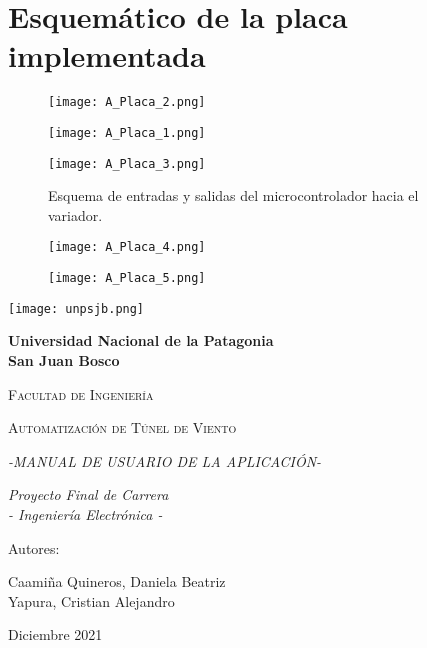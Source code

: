 \section{Esquemático de la placa implementada}
\begin{figure}[H]
	\centering
	\texttt{[image: A\_Placa\_2.png]}
\end{figure}
\begin{figure}[H]
	\centering	\texttt{[image: A\_Placa\_1.png]}
\end{figure}
\begin{figure}[H]
	\centering
	\texttt{[image: A\_Placa\_3.png]}
	
	\caption{Esquema de entradas y salidas del microcontrolador hacia el variador.} 
\end{figure}
\begin{figure}[H]
	\centering	\texttt{[image: A\_Placa\_4.png]}
\end{figure}	
\begin{figure}[H]
	\centering	\texttt{[image: A\_Placa\_5.png]}
\end{figure}


\newpage




\begin{center}
		{\texttt{[image: unpsjb.png]}\par}
	\vspace{1cm}
	{\bfseries\LARGE Universidad Nacional de la Patagonia\\ San Juan Bosco \par}
	\vspace{1cm}
	{\scshape\Large Facultad de Ingenier\'ia \par}
	\vspace{3cm}
	{\scshape\Huge Automatización de Túnel de Viento \par}
		{\itshape\Large -MANUAL DE USUARIO DE LA APLICACIÓN- \par}
	
	
	\vspace{3cm}
	{\itshape\Large Proyecto Final de Carrera\\ - Ingeniería Electrónica - \par}
	\vfill
	{\Large Autores: \par}
	{\Large Caamiña Quineros, Daniela Beatriz\\ Yapura, Cristian Alejandro \par}
	\vfill
	{\Large Diciembre 2021 \par}
\end{center}





